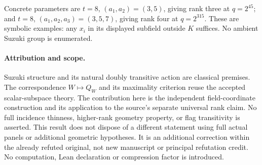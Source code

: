 \documentclass[11pt,a4paper]{article}
\begin{document}
Concrete parameters are $t=8$, $(a_1,a_2)=(3,5)$, giving rank
three at $q=2^{45}$; and $t=8$, $(a_1,a_2,a_3)=(3,5,7)$,
giving rank four at $q=2^{315}$. These are symbolic examples:
any $x_i$ in its displayed subfield outside $K$ suffices.
No ambient Suzuki group is enumerated.

\paragraph{Attribution and scope.}
Suzuki structure and its natural doubly transitive action are classical
premises. The correspondence $W\mapsto Q_W$ and its maximality criterion
reuse the accepted scalar-subspace theory. The contribution here is
the independent field-coordinate construction and its application to
the source's separate universal rank claim. No full incidence thinness,
higher-rank geometry property, or flag transitivity is asserted.
This result does not dispose of a different statement using full actual
panels or additional geometric hypotheses. It is an additional correction
within the already refuted original, not new manuscript or principal
refutation credit. No computation, Lean declaration or compression
factor is introduced.
\end{document}

